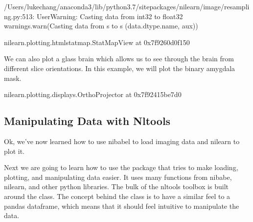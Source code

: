 \documentclass[letterpaper,10pt,english]{sphinxmanual}
\begin{document}
\begin{sphinxVerbatim}[commandchars=\\\{\}]
/Users/lukechang/anaconda3/lib/python3.7/site\PYGZhy{}packages/nilearn/image/resampling.py:513: UserWarning: Casting data from int32 to float32
  warnings.warn(\PYGZdq{}Casting data from \PYGZpc{}s to \PYGZpc{}s\PYGZdq{} \PYGZpc{} (data.dtype.name, aux))
\end{sphinxVerbatim}

\begin{sphinxVerbatim}[commandchars=\\\{\}]
\PYGZlt{}nilearn.plotting.html\PYGZus{}stat\PYGZus{}map.StatMapView at 0x7f9260d0f150\PYGZgt{}
\end{sphinxVerbatim}

We can also plot a glass brain which allows us to see through the brain from different slice orientations. In this example, we will plot the binary amygdala mask.

\begin{sphinxVerbatim}[commandchars=\\\{\}]
\end{sphinxVerbatim}

\begin{sphinxVerbatim}[commandchars=\\\{\}]
\PYGZlt{}nilearn.plotting.displays.OrthoProjector at 0x7f92415be7d0\PYGZgt{}
\end{sphinxVerbatim}

\noindent{}


\subsection{Manipulating Data with Nltools}
\label{\detokenize{content/Introduction_to_Neuroimaging_Data:manipulating-data-with-nltools}}
Ok, we’ve now learned how to use nibabel to load imaging data and nilearn to plot it.

Next we are going to learn how to use the  package that tries to make loading, plotting, and manipulating data easier. It uses many functions from nibabe, nilearn, and other python libraries. The bulk of the nltools toolbox is built around the  class. The concept behind the class is to have a similar feel to a pandas dataframe, which means that it should feel intuitive to manipulate the data.
\end{document}
